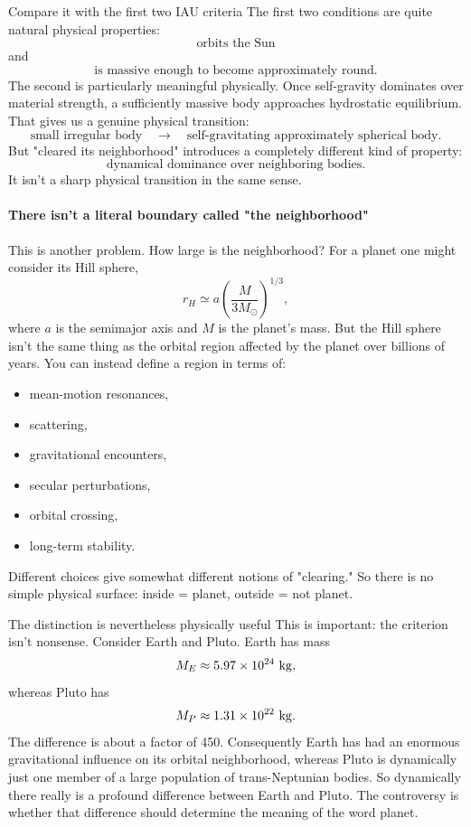 Compare it with the first two IAU criteria
The first two conditions are quite natural physical properties:
$$ \boxed{\text{orbits the Sun}} $$
and
$$ \boxed{\text{is massive enough to become approximately round}}. $$
The second is particularly meaningful physically. Once self-gravity dominates over material strength, a sufficiently massive body approaches hydrostatic equilibrium.
That gives us a genuine physical transition:
$$ \text{small irregular body} \quad\longrightarrow\quad \text{self-gravitating approximately spherical body}. $$
But "cleared its neighborhood" introduces a completely different kind of property:
$$ \boxed{\text{dynamical dominance over neighboring bodies}}. $$
It isn't a sharp physical transition in the same sense.
\paragraph{ There isn't a literal boundary called "the neighborhood"}
This is another problem.
How large is the neighborhood?
For a planet one might consider its Hill sphere,
$$ r_H \simeq a\left(\frac{M}{3M_\odot}\right)^{1/3}, $$
where \(a\) is the semimajor axis and \(M\) is the planet's mass.
But the Hill sphere isn't the same thing as the orbital region affected by the planet over billions of years.
You can instead define a region in terms of:
\begin{itemize}
\item mean-motion resonances,
\item scattering,
\item gravitational encounters,
\item secular perturbations,
\item orbital crossing,
\item long-term stability.
\end{itemize}
Different choices give somewhat different notions of "clearing."
So there is no simple physical surface:
inside = planet, outside = not planet.

 The distinction is nevertheless physically useful
This is important: the criterion isn't nonsense.
Consider Earth and Pluto.
Earth has mass
$$ M_E \approx 5.97\times10^{24}\ {\rm kg}, $$
whereas Pluto has
$$ M_P \approx 1.31\times10^{22}\ {\rm kg}. $$
The difference is about a factor of 450.
Consequently Earth has had an enormous gravitational influence on its orbital neighborhood, whereas Pluto is dynamically just one member of a large population of trans-Neptunian bodies.
So dynamically there really is a profound difference between Earth and Pluto.
The controversy is whether that difference should determine the meaning of the word planet.

